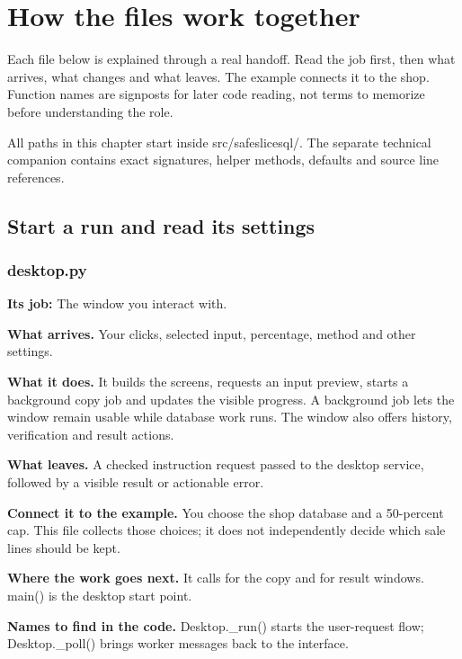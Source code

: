 \chapter{How the files work together}

Each file below is explained through a real handoff. Read the job first, then what arrives, what changes and what leaves. The example connects it to the shop. Function names are signposts for later code reading, not terms to memorize before understanding the role.

All paths in this chapter start inside src/safeslicesql/. The separate technical companion contains exact signatures, helper methods, defaults and source line references.

\section{Start a run and read its settings}


\subsection{desktop.py}

\textbf{Its job:} The window you interact with.

\textbf{What arrives.} Your clicks, selected input, percentage, method and other settings.

\textbf{What it does.} It builds the screens, requests an input preview, starts a background copy job and updates the visible progress. A background job lets the window remain usable while database work runs. The window also offers history, verification and result actions.

\textbf{What leaves.} A checked instruction request passed to the desktop service, followed by a visible result or actionable error.

\textbf{Connect it to the example.} You choose the shop database and a 50-percent cap. This file collects those choices; it does not independently decide which sale lines should be kept.

\textbf{Where the work goes next.} It calls  for the copy and  for result windows. main() is the desktop start point.

\textbf{Names to find in the code.} Desktop.\_run() starts the user-request flow; Desktop.\_poll() brings worker messages back to the interface.

